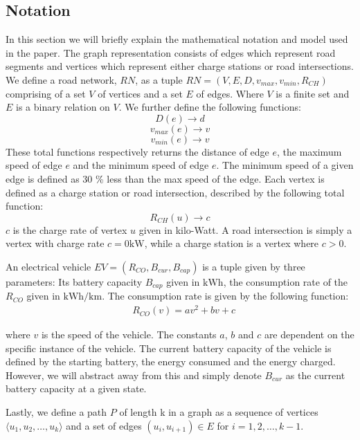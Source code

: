 \subsection{Notation} \label{sec:notation}
In this section we will briefly explain the mathematical notation and model used in the paper. The graph representation consists of edges which represent road segments and vertices which represent either charge stations or road intersections. We define a road network, $RN$, as a tuple $RN=(V,E,D,v_{max},v_{min},R_{CH})$ comprising of a set $V$ of vertices and a set $E$ of edges. Where $V$ is a finite set and $E$ is a binary relation on $V$. We further define the following functions:
\[ D(e)\rightarrow d \] 
\[ v_{max}(e)\rightarrow v \]
\[ v_{min}(e)\rightarrow v \]
These total functions respectively returns the distance of edge $e$, the maximum speed of edge $e$ and the minimum speed of edge $e$. The minimum speed of a given edge is defined as 30 \% less than the max speed of the edge. Each vertex is defined as a charge station or road intersection, described by the following total function:
\[R_{CH}(u)\rightarrow c\]
$c$ is the charge rate of vertex $u$ given in kilo-Watt. A road intersection is simply a vertex with charge rate $c = 0\si{\kW}$, while a charge station is a vertex where $c > 0$.

An electrical vehicle $EV=(R_{CO},B_{cur},B_{cap})$ is a tuple given by three parameters: Its battery capacity $B_{cap}$ given in $\si{\kWh}$, the consumption rate of the $R_{CO}$ given in $\si{\kWh\per\km}$. The consumption rate is given by the following function:
\begin{equation}
\begin{aligned}
 & R_{CO}(v)=av^2+bv+c
\end{aligned}
\end{equation}\label{eq:chargingFunc}

where $v$ is the speed of the vehicle. The constants $a$, $b$ and $c$ are dependent on the specific instance of the vehicle. The current battery capacity of the vehicle is defined by the starting battery, the energy consumed and the energy charged. However, we will abstract away from this and simply denote $B_{cur}$ as the current battery capacity at a given state.

Lastly, we define a path $P$ of length k in a graph as a sequence of vertices $\langle u_1,u_2,\dots,u_k \rangle$ and a set of edges $(u_{i},u_{i+1})\in E$ for $i=1,2,\dots,k-1$.


